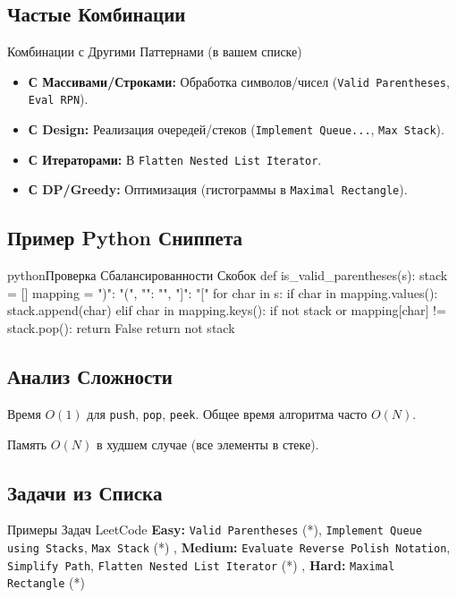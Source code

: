 \subsection{Частые Комбинации}
\begin{myblock}{Комбинации с Другими Паттернами (в вашем списке)}
    \begin{itemize}[nosep, leftmargin=*]
        \item \textbf{С Массивами/Строками:} Обработка символов/чисел (\texttt{Valid Parentheses}, \texttt{Eval RPN}).
        \item \textbf{С Design:} Реализация очередей/стеков (\texttt{Implement Queue...}, \texttt{Max Stack}).
        \item \textbf{С Итераторами:} В \texttt{Flatten Nested List Iterator}.
        \item \textbf{С DP/Greedy:} Оптимизация (гистограммы в \texttt{Maximal Rectangle}).
    \end{itemize}
\end{myblock}

\subsection{Пример Python Сниппета}
\begin{codebox}{python}{Проверка Сбалансированности Скобок}
def is_valid_parentheses(s):
    stack = []
    mapping = {")": "(", "}": "{", "]": "["}
    for char in s:
        if char in mapping.values():
            stack.append(char)
        elif char in mapping.keys():
            if not stack or mapping[char] != stack.pop():
                return False
    return not stack
\end{codebox}

\subsection{Анализ Сложности}
\begin{myblock}{Время}
    $O(1)$ для \texttt{push}, \texttt{pop}, \texttt{peek}. Общее время алгоритма часто $O(N)$.
\end{myblock}
\begin{myblock}{Память}
    $O(N)$ в худшем случае (все элементы в стеке).
\end{myblock}

\subsection{Задачи из Списка}
\begin{myblock}{Примеры Задач LeetCode}
    \textbf{Easy:} \texttt{Valid Parentheses} (*), \texttt{Implement Queue using Stacks}, \texttt{Max Stack} (*) \sep
    \textbf{Medium:} \texttt{Evaluate Reverse Polish Notation}, \texttt{Simplify Path}, \texttt{Flatten Nested List Iterator} (*) \sep
    \textbf{Hard:} \texttt{Maximal Rectangle} (*)
\end{myblock}

